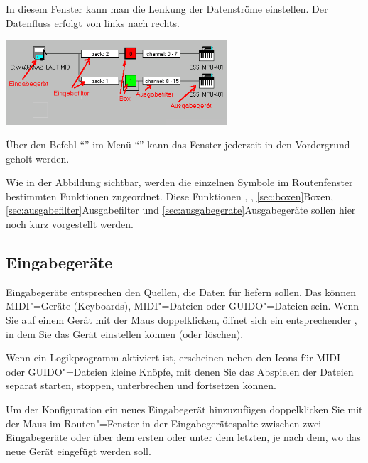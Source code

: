{In diesem Fenster kann man die Lenkung der Datenströme einstellen. 
Der Datenfluss erfolgt von links nach rechts.

\begin{center}
\ifhtml
{}
\else
\includegraphics[width=234pt]{Route}
\fi
\end{center}

Über den Befehl "`"' im Menü
"`"' kann das Fenster jederzeit in den
Vordergrund geholt werden.

Wie in der Abbildung sichtbar, werden die einzelnen Symbole im
Routenfenster bestimmten Funktionen zugeordnet. Diese Funktionen
,
, \ref{sec:boxen}{Boxen}, 
\ref{sec:ausgabefilter}{Ausgabefilter} und
\ref{sec:ausgabegerate}{Ausgabegeräte} sollen hier noch kurz
vorgestellt werden.

\subsection{Eingabegeräte}\label{sec:eingabegerate}

Eingabegeräte entsprechen den Quellen, die Daten für \mutabor{} liefern 
sollen. Das können MIDI"=Geräte (Keyboards), MIDI"=Dateien 
oder GUIDO"=Dateien sein. Wenn Sie auf einem Gerät mit der Maus 
doppelklicken, öffnet sich ein entsprechender ,
in dem Sie das Gerät einstellen können (oder löschen).

Wenn ein Logikprogramm aktiviert ist, erscheinen neben den Icons 
für MIDI- oder GUIDO"=Dateien kleine Knöpfe, mit denen Sie 
das Abspielen der Dateien separat starten, stoppen, unterbrechen 
und fortsetzen können.

Um der Konfiguration ein neues Eingabegerät hinzuzufügen 
doppelklicken Sie mit der Maus im Routen"=Fenster in der Eingabegerätespalte 
zwischen zwei Eingabegeräte oder über dem ersten oder unter 
dem letzten, je nach dem, wo das neue Gerät eingefügt werden 
soll.


}
